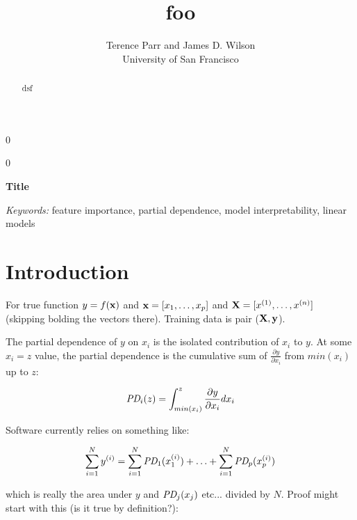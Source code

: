 \documentclass[12pt]{article}
\newcommand{\blind}{0}
\begin{document}
\def\spacingset#1{\renewcommand{\baselinestretch}%
{#1}\small\normalsize} \spacingset{1}



\blind
{
  \title{\bf foo}

  \author{Terence Parr and James D. Wilson\\
      University of San Francisco\\
}
  \maketitle
} \fi

\blind
{
  \bigskip
  \bigskip
  \bigskip
  \begin{center}
    {\LARGE\bf Title}
\end{center}
  \medskip
} \fi

\bigskip
\begin{abstract}
dsf
\end{abstract}

\noindent%
{\it Keywords:} feature importance, partial dependence, model interpretability, linear models

\section{Introduction}
\label{sec:intro}

For true function $y = f(\bf x)$ and ${\bf x} = [x_1, \ldots, x_p]$ and ${\bf X} = [x^{(1)}, \ldots, x^{(n)}]$ (skipping bolding the vectors there).  Training data is pair ($\bf X, y$).

The partial dependence of $y$ on  $x_i$ is the isolated contribution of $x_i$ to $y$. At some $x_i=z$ value, the partial dependence is the cumulative sum of $\frac{\partial y}{\partial x_i}$ from $min(x_i)$ up to $z$:

\[
\text{\it PD}_i(z) = \int_{min(x_i)}^z \frac{\partial y}{\partial x_i} dx_i
\]

Software currently relies on something like:

\[
\sum_{i=1}^{N} y^{(i)} = \sum_{i=1}^{N}\text{\it PD}_1(x_1^{(i)}) + \ldots + \sum_{i=1}^{N}\text{\it PD}_p(x_p^{(i)})
\]

\noindent which is really the area under $y$ and $\text{\it PD}_j(x_j)$ etc... divided by $N$.   Proof might start with this (is it true by definition?):
\end{document}
